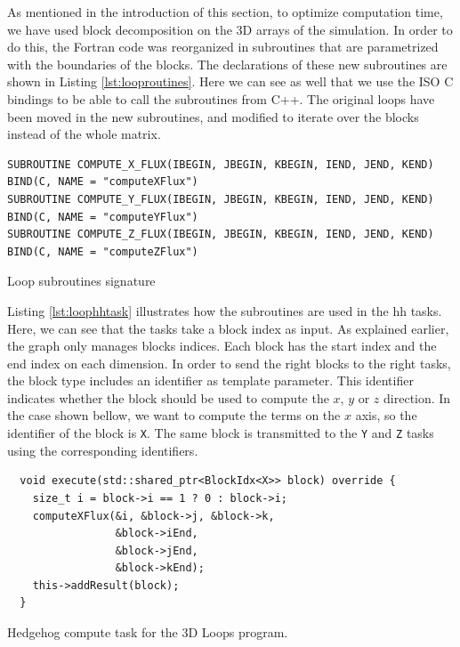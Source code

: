 As mentioned in the introduction of this section, to optimize computation time,
we have used block decomposition on the 3D arrays of the simulation. In order to
do this, the Fortran code was reorganized in subroutines that are parametrized
with the boundaries of the blocks. The declarations of these new subroutines are
shown in Listing \ref{lst:looproutines}. Here we can see as well that we use
the ISO C bindings to be able to call the subroutines from C++. The original
loops have been moved in the new subroutines, and modified to iterate over the
blocks instead of the whole matrix. \clearpage{}

\begin{listing}[ht!]
\begin{verbatim}
SUBROUTINE COMPUTE_X_FLUX(IBEGIN, JBEGIN, KBEGIN, IEND, JEND, KEND) BIND(C, NAME = "computeXFlux")
SUBROUTINE COMPUTE_Y_FLUX(IBEGIN, JBEGIN, KBEGIN, IEND, JEND, KEND) BIND(C, NAME = "computeYFlux")
SUBROUTINE COMPUTE_Z_FLUX(IBEGIN, JBEGIN, KBEGIN, IEND, JEND, KEND) BIND(C, NAME = "computeZFlux")
\end{verbatim}
\caption{Loop subroutines signature}
\label{lst:looproutines}
\end{listing}

Listing \ref{lst:loophhtask} illustrates how the subroutines are used in the
\gls{hh} tasks. Here, we can see that the tasks take a block index as input. As
explained earlier, the graph only manages blocks indices. Each block has the
start index and the end index on each dimension. In order to send the right
blocks to the right tasks, the block type includes an identifier as template
parameter. This identifier indicates whether the block should be used to
compute the $x$, $y$ or $z$ direction. In the case shown bellow, we want to
compute the terms on the $x$ axis, so the identifier of the block is \texttt{X}.
The same block is transmitted to the \texttt{Y} and \texttt{Z} tasks
using the corresponding identifiers.

\begin{listing}[ht!]
\begin{verbatim}
  void execute(std::shared_ptr<BlockIdx<X>> block) override {
    size_t i = block->i == 1 ? 0 : block->i;
    computeXFlux(&i, &block->j, &block->k,
                 &block->iEnd,
                 &block->jEnd,
                 &block->kEnd);
    this->addResult(block);
  }
\end{verbatim}
\caption{Hedgehog compute task for the 3D Loops program.}
\label{lst:loophhtask}
\end{listing}

